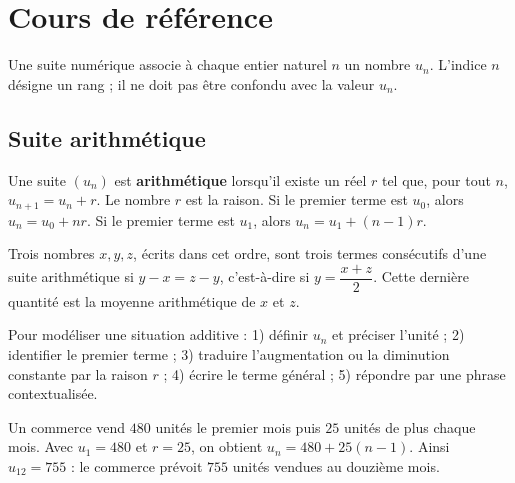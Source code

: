 

\section{Cours de référence}
Une suite numérique associe à chaque entier naturel $n$ un nombre $u_n$. L'indice $n$ désigne un rang ; il ne doit pas être confondu avec la valeur $u_n$.

\subsection{Suite arithmétique}
\begin{keypoint}
Une suite $(u_n)$ est \textbf{arithmétique} lorsqu'il existe un réel $r$ tel que, pour tout $n$, $u_{n+1}=u_n+r$. Le nombre $r$ est la raison. Si le premier terme est $u_0$, alors $u_n=u_0+nr$. Si le premier terme est $u_1$, alors $u_n=u_1+(n-1)r$.
\end{keypoint}

\begin{center}
\end{center}

Trois nombres $x,y,z$, écrits dans cet ordre, sont trois termes consécutifs d'une suite arithmétique si $y-x=z-y$, c'est-à-dire si $y=\dfrac{x+z}{2}$. Cette dernière quantité est la moyenne arithmétique de $x$ et $z$.

\begin{method}
Pour modéliser une situation additive : 1) définir $u_n$ et préciser l'unité ; 2) identifier le premier terme ; 3) traduire l'augmentation ou la diminution constante par la raison $r$ ; 4) écrire le terme général ; 5) répondre par une phrase contextualisée.
\end{method}

\begin{example}
Un commerce vend $480$ unités le premier mois puis $25$ unités de plus chaque mois. Avec $u_1=480$ et $r=25$, on obtient $u_n=480+25(n-1)$. Ainsi $u_{12}=755$ : le commerce prévoit $755$ unités vendues au douzième mois.
\end{example}

